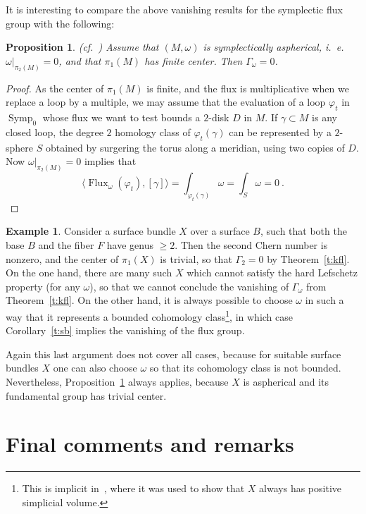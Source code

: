 \documentclass[12pt]{amsart}
\newtheorem{proposition}[theorem]{Proposition}
\theoremstyle{definition}
\newtheorem{example}[theorem]{Example}
\theoremstyle{remark}
\newcommand\Flux{\operatorname{Flux}}
\newcommand\Symp{\operatorname{Symp}}
\begin{document}
It is interesting to compare the above vanishing results for the symplectic flux group with the 
following:
\begin{proposition}\label{p:P}{\rm (cf.~\cite{LMPflux,Polterovich})}
Assume that $(M,\omega)$ is symplectically aspherical, i.~e. $\omega\vert_{\pi_2(M)}=0$,
and that $\pi_1(M)$ has finite center. Then $\Gamma_{\omega}=0$.
\end{proposition}
\begin{proof}
As the center of $\pi_1(M)$ is finite, and the flux is multiplicative when we replace a loop by a 
multiple, we may assume that the evaluation of a loop $\varphi_t$ in $\Symp_0$ whose flux we 
want to test bounds a $2$-disk $D$ in $M$. If $\gamma\subset M$ is any closed loop, the degree
$2$ homology class of $\varphi_t(\gamma)$ can be represented by a $2$-sphere $S$ obtained 
by surgering the torus along a meridian, using two copies of $D$. Now $\omega\vert_{\pi_2(M)}=0$
implies that 
$$
\langle \Flux_{\omega} (\varphi_t), [\gamma]\rangle = \int_{\varphi_t(\gamma)}\omega =\int_S\omega=0 \ .
$$
\end{proof}

\begin{example}
    Consider a surface bundle $X$ over a surface $B$, such that both the base $B$ and the 
    fiber $F$ have genus $\geq 2$. Then the second Chern number is nonzero, and the center 
    of $\pi_1(X)$ is trivial, so that $\Gamma_{2}=0$ by Theorem~\ref{t:kfl}. On the one hand, there are 
    many such $X$ which cannot satisfy the hard Lefschetz property (for any $\omega$), so that 
    we cannot conclude the vanishing of $\Gamma_{\omega}$ from Theorem~\ref{t:kfl}. On the other hand, 
    it is always possible to choose $\omega$ in such a way that it represents a bounded cohomology 
    class\footnote{This is implicit in~\cite{HK}, where it was used to show that $X$ always has positive 
    simplicial volume.}, in which case Corollary~\ref{t:sb} implies the vanishing of the flux group.
    
    Again this last argument does not cover all cases, because for suitable surface bundles $X$ 
    one can also choose $\omega$ so that its cohomology class is not bounded. Nevertheless,
    Proposition~\ref{p:P} always applies, because $X$ is aspherical and its fundamental group has 
    trivial center.
    \end{example}
    
\section{Final comments and remarks}
\end{document}
